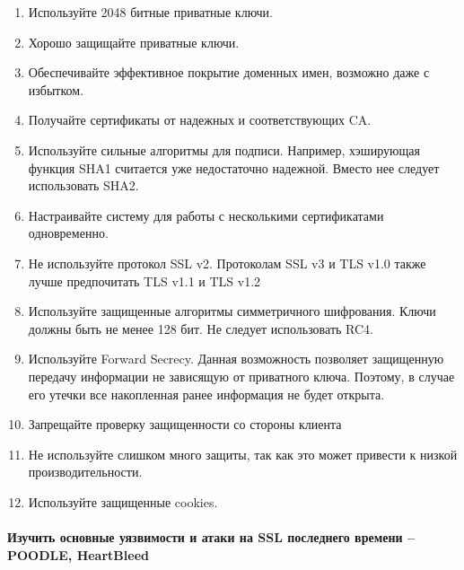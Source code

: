 \documentclass{article}
\begin{document}
\begin{enumerate}
\item Используйте 2048 битные приватные ключи.
\item Хорошо защищайте приватные ключи.
\item Обеспечивайте эффективное покрытие доменных имен, возможно даже с избытком.
\item Получайте сертификаты от надежных и соответствующих CA.
\item Используйте сильные алгоритмы для подписи. Например, хэширующая функция SHA1 считается уже недостаточно надежной. Вместо нее следует использовать SHA2.
\item Настраивайте систему для работы с несколькими сертификатами одновременно.
\item Не используйте протокол SSL v2. Протоколам SSL v3 и TLS v1.0 также лучше предпочитать TLS v1.1 и TLS v1.2
\item Используйте защищенные алгоритмы симметричного шифрования. Ключи должны быть не менее 128 бит. Не следует использовать RC4.
\item Используйте Forward Secrecy. Данная возможность позволяет защищенную передачу информации не зависящую от приватного ключа. Поэтому, в случае его утечки все накопленная ранее информация не будет открыта.
\item Запрещайте проверку защищенности со стороны клиента
\item Не используйте слишком много защиты, так как это может привести к низкой производительности.
\item Используйте защищенные cookies.
\end{enumerate}

\paragraph{Изучить основные уязвимости и атаки на SSL последнего времени – POODLE, HeartBleed}
~
\end{document}
